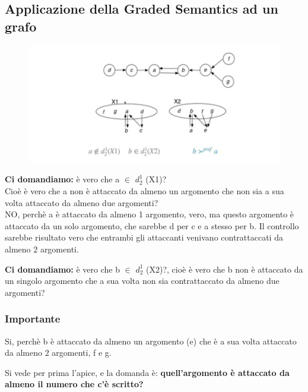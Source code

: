 \subsection{Applicazione della Graded Semantics ad un grafo}
\begin{figure}[htp]
	\centering
    \includegraphics[width=13cm, keepaspectratio]{img/Cap8/GdefnseGrafo.png}
\end{figure}
\noindent \textbf{Ci domandiamo:} è vero che a $\in$ $d^1_2$ (X1)? 
\\Cioè è vero che a non è attaccato da almeno un argomento che non sia a sua volta attaccato da almeno due argomenti? 
\\NO, perchè a è attaccato da almeno 1 argomento, vero, ma questo argomento è attaccato da un solo argomento, che sarebbe d per c e a stesso per b. Il controllo sarebbe risultato vero che entrambi gli attaccanti venivano contrattaccati da almeno 2 argomenti.

\vspace{0.4cm}

\noindent \textbf{Ci domandiamo:} è vero che b $\in$ $d^1_2$ (X2)?, cioè è vero che b non è attaccato da un singolo argomento che a sua volta non sia contrattaccato da almeno due argomenti?

\subsubsection{\textbf{Importante}}
Si, perchè b è attaccato da almeno un argomento (e) che è a sua volta attaccato da almeno 2 argomenti, f e g.

\vspace{0.3cm}

\noindent Si vede per prima l’apice, e la domanda è: \textbf{quell’argomento è attaccato da almeno il numero che c’è scritto?}

\vspace{0.3cm}

